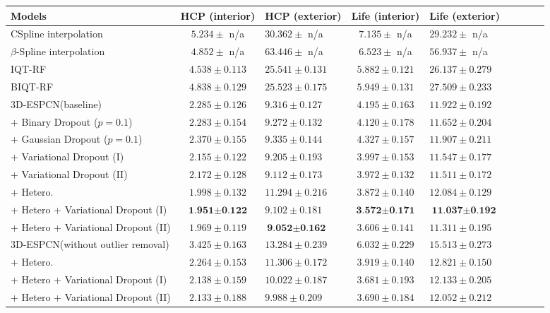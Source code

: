 \begin{table}
	\center
	\footnotesize
	\begin{tabular}{@{}lclclclcl}
		\hline
		Models & HCP (interior) & HCP (exterior)& Life (interior) & Life (exterior)   \\ 
		\hline	
		CSpline interpolation& $5.234 \pm$ n/a & $30.362\pm$ n/a & $7.135\pm$ n/a & $29.232\pm$ n/a  \\
		$\beta$-Spline interpolation &  $4.852 \pm$ n/a  &  $63.446\pm$ n/a & $6.523\pm$ n/a &  $56.937\pm$ n/a \\
		IQT-RF \cite{alexander2017image}&   $4.538 \pm 0.113$& $25.541\pm0.131$  & $5.882\pm0.121$  & $26.137\pm0.279$   \\ 
		BIQT-RF \cite{tanno2016bayesian} & $4.838 \pm 0.129$  &$25.523\pm0.175$  & $5.949\pm0.131$ &$27.509\pm0.233$ \\
				
		\hline
		3D-ESPCN(baseline)  & $2.285 \pm0.126$   & $9.316\pm0.127$ & $4.195 \pm0.163$ & $11.922 \pm0.192$ \\
		+ Binary Dropout ($p=0.1$) &    $2.283 \pm0.154$	 & $9.272\pm0.132$ & $4.120 \pm0.178$ &	$11.652 \pm0.204$	\\
		+ Gaussian Dropout ($p=0.1$)  &    $2.370 \pm0.155$	& 	$9.335\pm0.144$	& 	$4.327\pm0.157$	&	$11.907 \pm0.211$	\\
		+ Variational Dropout (I)& $2.155\pm0.122$ &   $9.205\pm0.193$ 	& 	$3.997 \pm0.153$  & $11.547 \pm0.177$ 	\\
		+ Variational Dropout (II)& $2.172\pm0.128$ &  $9.112\pm0.173$  &  $3.972 \pm0.132$ &  $11.511 \pm0.172$ & \\
		+ Hetero. &$1.998\pm0.132 $ & $11.294\pm 0.216$  & $3.872 \pm0.140$   & $12.084 \pm0.129$\\
		+ Hetero + Variational Dropout (I) &\cellcolor{red!15} $\textbf{1.951} \pm \textbf{0.122}$ & \cellcolor{blue!15}$9.102\pm0.181$ & \cellcolor{red!15} $\textbf{3.572}\pm\textbf{0.171}$  &\cellcolor{red!15}$\textbf{11.037} \pm\textbf{0.192}$  \\ 
		+ Hetero + Variational Dropout (II)&\cellcolor{blue!15} $1.969 \pm 0.119$ &\cellcolor{red!15}$\textbf{9.052}\pm\textbf{0.162}$& \cellcolor{blue!15} $3.606 \pm0.141$ & \cellcolor{blue!15}$11.311 \pm0.195$  \\
		\hline
		3D-ESPCN(without outlier removal)  & $3.425 \pm0.163$   & $13.284\pm0.239$ & $6.032 \pm0.229$ & $15.5 13 \pm0.273$ \\
		+ Hetero. &$2.264\pm0.153 $ & $11.306\pm 0.172$  & $3.919 \pm0.140$   & $12.821 \pm0.150$\\
		+ Hetero + Variational Dropout (I) & $2.138 \pm0.159$ & $10.022\pm0.187$ &  $3.681\pm0.193$  &$12.133 \pm 0.205 $  \\ 
		+ Hetero + Variational Dropout (II)& $2.133 \pm 0.188$ & $ 9.988 \pm 0.209$&  $3.690 \pm0.184$ & $12.052 \pm0.212$  \\
		\hline
	

\end{tabular}
\end{table}
